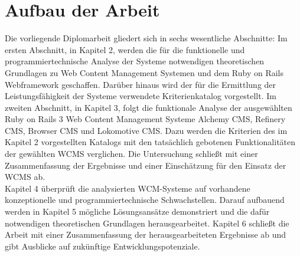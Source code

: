 \section{Aufbau der Arbeit}
Die vorliegende Diplomarbeit gliedert sich in sechs wesentliche Abschnitte:
\newline
\newline
Im ersten Abschnitt, in Kapitel 2, werden die für die funktionelle und programmiertechnische Analyse der Systeme notwendigen theoretischen Grundlagen zu Web Content Management Systemen und dem Ruby on Rails Webframework geschaffen.
Darüber hinaus wird der für die Ermittlung der Leistungsfähigkeit der Systeme verwendete Kriterienkatalog vorgestellt.
\newline
\newline
Im zweiten Abschnitt, in Kapitel 3, folgt die funktionale Analyse der ausgewählten Ruby on Rails 3 Web Content Management Systeme Alchemy CMS, Refinery CMS, Browser CMS und Lokomotive CMS. Dazu werden die Kriterien des im Kapitel 2 vorgestellten Katalogs mit den tatsächlich gebotenen Funktionalitäten der gewählten WCMS verglichen. Die Untersuchung schließt mit einer Zusammenfassung der Ergebnisse und einer Einschätzung für den Einsatz der WCMS ab.\\
\newline
Kapitel 4 überprüft die analysierten WCM-Systeme auf vorhandene konzeptionelle und programmiertechnische Schwachstellen.
Darauf aufbauend werden in Kapitel 5 mögliche Lösungsansätze demonstriert und die dafür notwendigen theoretischen Grundlagen herausgearbeitet.
Kapitel 6 schließt die Arbeit mit einer Zusammenfassung der herausgearbeiteten Ergebnisse ab und gibt Ausblicke auf zukünftige Entwicklungspotenziale.
%
%

